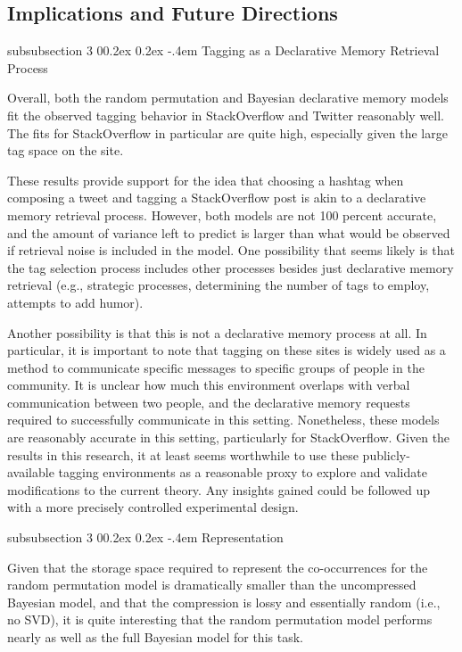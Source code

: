 \documentclass[man,floatsintext,donotrepeattitle]{apa6}
\makeatletter
\renewcommand{\subsubsection}{%
  \@startsection
  {subsubsection}%
  {3}%
  {\parindent}%
  {0\baselineskip \@plus 0.2ex \@minus 0.2ex}%
  {-.4em}%
  {\normalfont\normalsize\bfseries\addperi}}
\makeatother
\begin{document}
\subsection{Implications and Future Directions}

\subsubsection{Tagging as a Declarative Memory Retrieval Process}

Overall, both the random permutation and Bayesian declarative memory models fit the observed tagging behavior in StackOverflow and Twitter reasonably well.
The fits for StackOverflow in particular are quite high, especially given the large tag space on the site.

These results provide support for the idea that choosing a hashtag when composing a tweet and tagging a StackOverflow post is akin to a declarative memory retrieval process.
However, both models are not 100 percent accurate, and the amount of variance left to predict is larger than what would be observed if retrieval noise is included in the model.
One possibility that seems likely is that the tag selection process includes other processes besides just declarative memory retrieval
(e.g., strategic processes, determining the number of tags to employ, attempts to add humor).

Another possibility is that this is not a declarative memory process at all.
In particular, it is important to note that tagging on these sites is widely used as a method to communicate specific messages to specific groups of people in the community.
It is unclear how much this environment overlaps with verbal communication between two people, and the declarative memory requests required to successfully communicate in this setting.
Nonetheless, these models are reasonably accurate in this setting, particularly for StackOverflow.
Given the results in this research, it at least seems worthwhile to use these publicly-available tagging environments as a reasonable proxy to explore and validate modifications to the current theory.
Any insights gained could be followed up with a more precisely controlled experimental design.

\subsubsection{Representation}

Given that the storage space required to represent the co-occurrences for the random permutation model is dramatically smaller than the uncompressed Bayesian model,
and that the compression is lossy and essentially random (i.e., no SVD),
it is quite interesting that the random permutation model performs nearly as well as the full Bayesian model for this task.
\end{document}
